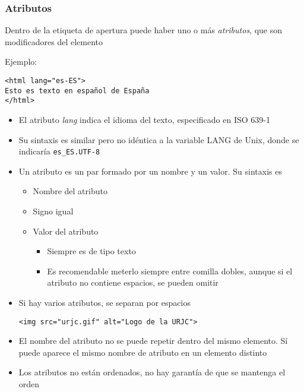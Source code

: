 \documentclass[ucs]{beamer}
\begin{document}
\begin{frame}[fragile]
\frametitle{Atributos}
Dentro de la etiqueta de apertura puede haber uno o más
\emph{atributos},
que son modificadores del elemento

Ejemplo:

  \begin{footnotesize}
  \begin{verbatim}
<html lang="es-ES">
Esto es texto en español de España
</html>\end{verbatim}
  \end{footnotesize}


    \begin{itemize}
    \item
El atributo
\emph{lang} indica el idioma del texto, especificado en ISO 639-1
    \item
Su sintaxis es similar pero no idéntica a la variable LANG de Unix, donde se indicaría \verb|es_ES.UTF-8|

    \end{itemize}


\end{frame}

\begin{frame}[fragile]

\begin{itemize}
\item
Un atributo es un par formado por un nombre y un valor. Su sintaxis es
    \begin{itemize}
    \item
Nombre del atributo
    \item
Signo igual
    \item
Valor del atributo 


    \begin{itemize}
    \item
Siempre es de tipo texto
    \item

Es recomendable meterlo siempre entre comilla dobles, aunque si el atributo no contiene espacios, se pueden omitir
    \end{itemize}
    \end{itemize}




\item
Si hay varios atributos, se separan por espacios

\verb|<img src="urjc.gif" alt="Logo de la URJC">|

\item
El nombre del atributo no se puede repetir dentro del mismo elemento. Sí puede aparece
el mismo nombre de atributo en un elemento distinto
\item
Los atributos no están ordenados, no hay garantía de que se mantenga
el orden
\end{itemize}




\end{frame}
\end{document}
